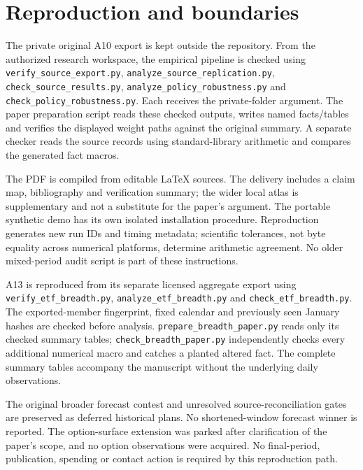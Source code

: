 \documentclass[11pt,a4paper]{article}
\begin{document}
\clearpage


\section{Reproduction and boundaries}
The private original A10 export is kept outside the repository. From the authorized research workspace, the empirical pipeline is checked using \nolinkurl{verify_source_export.py}, \nolinkurl{analyze_source_replication.py}, \nolinkurl{check_source_results.py}, \nolinkurl{analyze_policy_robustness.py} and \nolinkurl{check_policy_robustness.py}. Each receives the private-folder argument. The paper preparation script reads these checked outputs, writes named facts/tables and verifies the displayed weight paths against the original summary. A separate checker reads the source records using standard-library arithmetic and compares the generated fact macros.

The PDF is compiled from editable \LaTeX{} sources. The delivery includes a claim map, bibliography and verification summary; the wider local atlas is supplementary and not a substitute for the paper's argument. The portable synthetic demo has its own isolated installation procedure. Reproduction generates new run IDs and timing metadata; scientific tolerances, not byte equality across numerical platforms, determine arithmetic agreement. No older mixed-period audit script is part of these instructions.

A13 is reproduced from its separate licensed aggregate export using \nolinkurl{verify_etf_breadth.py}, \nolinkurl{analyze_etf_breadth.py} and \nolinkurl{check_etf_breadth.py}. The exported-member fingerprint, fixed calendar and previously seen January hashes are checked before analysis. \nolinkurl{prepare_breadth_paper.py} reads only its checked summary tables; \nolinkurl{check_breadth_paper.py} independently checks every additional numerical macro and catches a planted altered fact. The complete summary tables accompany the manuscript without the underlying daily observations.

The original broader forecast contest and unresolved source-reconciliation gates are preserved as deferred historical plans. No shortened-window forecast winner is reported. The option-surface extension was parked after clarification of the paper's scope, and no option observations were acquired. No final-period, publication, spending or contact action is required by this reproduction path.

\end{document}

